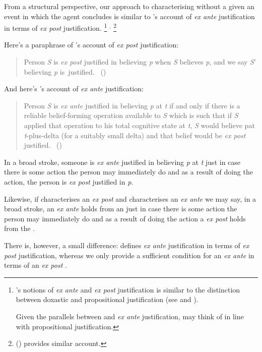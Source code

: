 \begin{note}
  From a structural perspective, our approach to characterising  without a given an event in which the agent concludes is similar to \citeauthor{Goldman:1979ui}'s account of \emph{ex ante} justification in terms of \emph{ex post} justification.%
  \footnote{
    \citeauthor{Goldman:1979ui}'s notions of \emph{ex ante} and \emph{ex post} justification is similar to the distinction between doxastic and propositional justification (see \cite{Firth:1978vi} and \cite[esp.\ fn.1]{Silva:2020aa}).

    Given the parallels between  and \emph{ex ante} justification, may think of  in line with propositional justification.
  }%
  \(^{,}\)%
  \footnote{
    \citeauthor{Turri:2010aa} (\citeyear{Turri:2010aa}) provides similar account.
  }

  Here's a paraphrase of \citeauthor{Goldman:1979ui}'s account of \emph{ex post} justification:
  \begin{quote}
    Person \emph{S} is \emph{ex post} justified in believing \emph{p} when \emph{S} believes \emph{p}, and we say \emph{S}' believing \emph{p} is~justified.%
    \mbox{ }\hfill\mbox{(\citeyear[Cf.][21]{Goldman:1979ui})}
  \end{quote}
  And here's \citeauthor{Goldman:1979ui}'s account of \emph{ex ante} justification:
  \begin{quote}
    Person \emph{S} is \emph{ex ante} justified in believing \emph{p} at \emph{t} if and only if there is a reliable belief-forming operation available to \emph{S} which is such that if \emph{S} applied that operation to his total cognitive state at \emph{t}, \emph{S} would believe pat \emph{t}-plus-delta (for a suitably small delta) and that belief would be \emph{ex post} justified.%
    \mbox{ }\hfill\mbox{(\citeyear[21]{Goldman:1979ui})}
  \end{quote}
  In a broad stroke, someone is \emph{ex ante} justified in believing \emph{p} at \emph{t} just in case there is some action the person may immediately do and as a result of doing the action, the person is \emph{ex post} justified in \emph{p}.

  Likewise, if \support{} characterises an \emph{ex post}  and \supportII{} characterises an \emph{ex ante}  we may say, in a broad stroke, an \emph{ex ante} \ros{} holds from an \agpe{} just in case there is some action the person may immediately do and as a result of doing the action a \emph{ex post} \ros{} holds from the \agpe{}.

  There is, however, a small difference:
  \citeauthor{Goldman:1979ui} defines \emph{ex ante} justification in terms of \emph{ex post} justification, whereas we only provide a sufficient condition for an \emph{ex ante} \ros{} in terms of an \emph{ex post} \ros{}.
\end{note}





